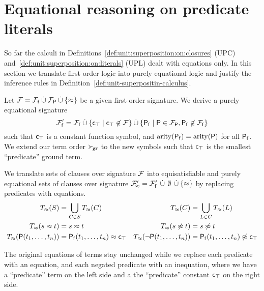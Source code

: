     \section{Equational reasoning on predicate literals}\label{sec:equational:reasoning:on:predicates}

    So far the calculi in Definitions~\ref{def:unit:superposition:on:closures} (UPC)
    and~\ref{def:unit:superposition:on:literals} (UPL) dealt
    with equations only.
    In this section we translate first order logic
    into purely equational logic and
    justify the inference rules in Definition~\vref{def:unit-superpositin-calculus}.

    \begin{definition}
        Let \( \mathcal{F} = {\mathcal{F}_{\mathsf{f}}} \mathbin{\dot\cup} {\mathcal{F}_{\mathsf{P}}} \mathbin{\dot\cup} \{\approx \} \) be a given first order signature.
        We derive a purely equational signature
        \[
            {\mathcal{F}'_{\mathsf{f}}} = {\mathcal{F}_{\mathsf{f}}}
 \mathbin{\dot\cup}
            \{ \mathsf{c}_\top \mid \mathsf{c}_\top\not\in\mathcal{F} \}
 \mathbin{\dot\cup}
            \{ \mathsf{P}_{\mathsf{f}} \mid \mathsf{P} \in {\mathcal{F}_{\mathsf{P}}}, \mathsf{P}_{\mathsf{f}}\not\in{\mathcal{F}_{\mathsf{f}}} \}
            \]
        such that \( \mathsf{c}_\top \) is a constant function symbol,
        and \( \operatorname{arity}(\mathsf{P}_{\mathsf{f}}) = \operatorname{arity}(\mathsf{P}) \) for all \( \mathsf{P}_{\mathsf{f}} \).
        We extend our term order \( \mathrel\succ_{\!\mathtt{gr}} \) to the new symbols
        such that \( \mathsf{c}_\top \) is the smallest “predicate” ground term.
    \end{definition}

    \begin{definition}
        We translate sets of clauses over signature \( \mathcal{F} \)
        into equisatisfiable and purely equational sets of clauses over signature
        \( {\mathcal{F}'_{\!\approx}} = {\mathcal{F}'_{\mathsf{f}}}
        \, \mathbin{\dot\cup} \, \emptyset
        \, \mathbin{\dot\cup}  \{ \approx \} \)
        by replacing predicates with equations.
        \begin{align*}
            T_\approx(S) &= \bigcup_{C\in S} T_\approx(C) &
            T_\approx(C) &= \bigcup_{L\in C} T_\approx(L) \\
            T_\approx(s\approx t) &= s\approx t &
            T_\approx(s\not\approx t) &= s\not\approx t \\
            T_\approx(\mathsf{P}(t_1,\ldots,t_n)) &= \mathsf{P}_{\mathsf{f}}(t_1,\ldots,t_n)\approx\mathsf{c}_\top &
            T_\approx(\lnot\mathsf{P}(t_1,\ldots,t_n)) &= \mathsf{P}_{\mathsf{f}}(t_1,\ldots,t_n)\not\approx\mathsf{c}_\top
        \end{align*}
    \end{definition}

    The original equations of terms stay unchanged
    while we replace each predicate with an equation,
    and each negated predicate with an inequation,
    where we have a “predicate” term on the left side
    and a the “predicate” constant \( \mathsf{c}_\top \) on the right side.



